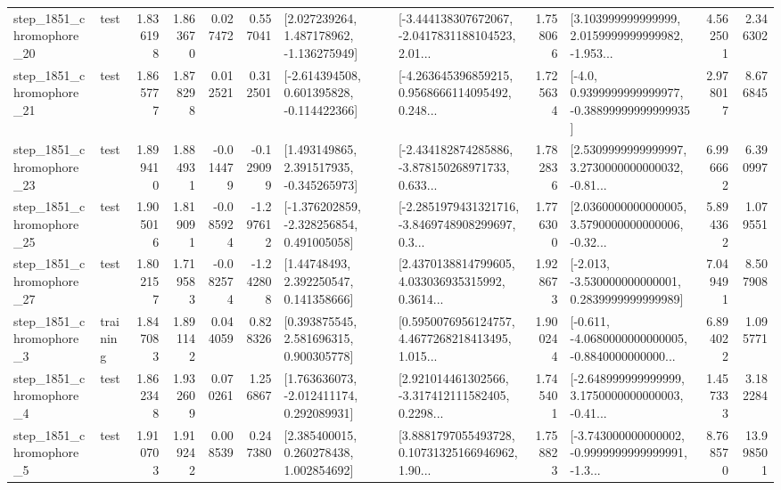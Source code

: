\begin{tabular}{llrrrrllrlrr}
 step\_1851\_chromophore\_20 &      test &      1.836198 &    1.863670 &      0.027472 &  0.557041 &    [2.027239264, 1.487178962, -1.136275949] &  [-3.444138307672067, -2.0417831188104523, 2.01... &       1.758066 &  [3.103999999999999, 2.0159999999999982, -1.953... &            4.562501 &          2.346302 \\
 step\_1851\_chromophore\_21 &      test &      1.865777 &    1.878298 &      0.012521 &  0.312501 &   [-2.614394508, 0.601395828, -0.114422366] &  [-4.263645396859215, 0.9568666114095492, 0.248... &       1.725634 &   [-4.0, 0.9399999999999977, -0.38899999999999935] &            2.978017 &          8.676845 \\
 step\_1851\_chromophore\_23 &      test &      1.899410 &    1.884931 &     -0.014479 & -0.129099 &    [1.493149865, 2.391517935, -0.345265973] &  [-2.434182874285886, -3.878150268971733, 0.633... &       1.782836 &  [2.5309999999999997, 3.2730000000000032, -0.81... &            6.996662 &          6.390997 \\
 step\_1851\_chromophore\_25 &      test &      1.905016 &    1.819091 &     -0.085924 & -1.297612 &   [-1.376202859, -2.328256854, 0.491005058] &  [-2.2851979431321716, -3.8469748908299697, 0.3... &       1.776300 &  [2.0360000000000005, 3.5790000000000006, -0.32... &            5.894362 &          1.079551 \\
 step\_1851\_chromophore\_27 &      test &      1.802157 &    1.719583 &     -0.082574 & -1.242808 &      [1.44748493, 2.392250547, 0.141358666] &  [2.4370138814799605, 4.033036935315992, 0.3614... &       1.928673 &   [-2.013, -3.530000000000001, 0.2839999999999989] &            7.049491 &          8.507908 \\
  step\_1851\_chromophore\_3 &  training &      1.847083 &    1.891142 &      0.044059 &  0.828326 &     [0.393875545, 2.581696315, 0.900305778] &  [0.5950076956124757, 4.4677268218413495, 1.015... &       1.900244 &  [-0.611, -4.0680000000000005, -0.8840000000000... &            6.894022 &          1.095771 \\
  step\_1851\_chromophore\_4 &      test &      1.862348 &    1.932609 &      0.070261 &  1.256867 &    [1.763636073, -2.012411174, 0.292089931] &  [2.921014461302566, -3.317412111582405, 0.2298... &       1.745401 &  [-2.648999999999999, 3.1750000000000003, -0.41... &            1.457333 &          3.182284 \\
  step\_1851\_chromophore\_5 &      test &      1.910703 &    1.919242 &      0.008539 &  0.247380 &     [2.385400015, 0.260278438, 1.002854692] &  [3.8881797055493728, 0.10731325166946962, 1.90... &       1.758823 &  [-3.743000000000002, -0.9999999999999991, -1.3... &            8.768570 &         13.998501 \\

\end{tabular}
